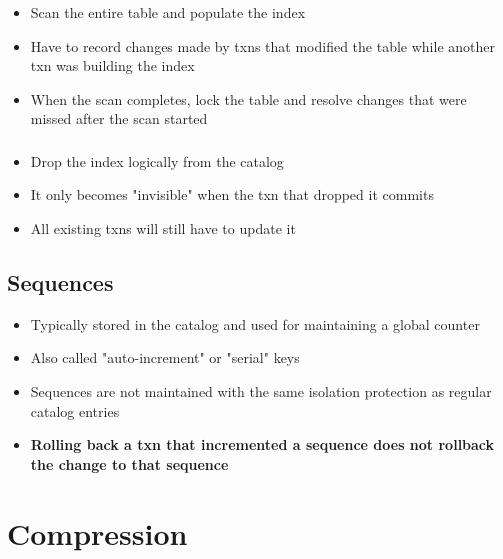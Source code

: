 \documentclass[11pt]{article}
\begin{document}
\subsubsection*{}
\begin{itemize}
    \item Scan the entire table and populate the index
    \item Have to record changes made by txns that modified the table while another txn was 
building the index
    \item When the scan completes, lock the table and resolve changes that were missed after the 
scan started
\end{itemize}

\subsubsection*{}
\begin{itemize}
    \item Drop the index logically from the catalog
    \item It only becomes "invisible" when the txn that dropped it commits
    \item All existing txns will still have to update it
\end{itemize}

    \subsection*{Sequences}
    \begin{itemize}
        \item Typically stored in the catalog and used for maintaining a global counter
        \item Also called "auto-increment" or "serial" keys
        \item Sequences are not maintained with the same isolation protection as regular catalog entries
        \item \textbf{Rolling back a txn that incremented a sequence does not rollback the change to that sequence}
    \end{itemize}


\section{Compression}
\end{document}
